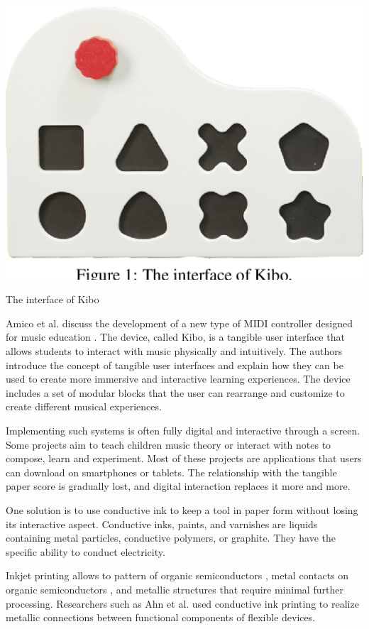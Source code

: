 \begin{marginfigure}
   \centering
   \includegraphics{images/IS_kibo.png}
   \caption{The interface of Kibo}
   \label{fig:amico2020kibo}
\end{marginfigure}

Amico et al. discuss the development of a new type of MIDI controller designed for music education \cite{amico2020kibo}. The device, called Kibo, is a tangible user interface that allows students to interact with music physically and intuitively.
The authors introduce the concept of tangible user interfaces and explain how they can be used to create more immersive and interactive learning experiences.
The device includes a set of modular blocks that the user can rearrange and customize to create different musical experiences.

Implementing such systems is often fully digital and interactive through a screen. Some projects aim to teach children music theory or interact with notes to compose, learn and experiment. Most of these projects are applications that users can download on smartphones or tablets. The relationship with the tangible paper score is gradually lost, and digital interaction replaces it more and more.

One solution is to use conductive ink to keep a tool in paper form without losing its interactive aspect. Conductive inks, paints, and varnishes are liquids containing metal particles, conductive polymers, or graphite. They have the specific ability to conduct electricity.

Inkjet printing allows to pattern of organic semiconductors \cite{kim2008heterogeneous}, metal contacts on organic semiconductors \cite{khan2019soft} \cite{wessely2020sprayable}, and metallic structures that require minimal further processing. Researchers such as Ahn et al. used conductive ink printing to realize metallic connections between functional components of flexible devices.

